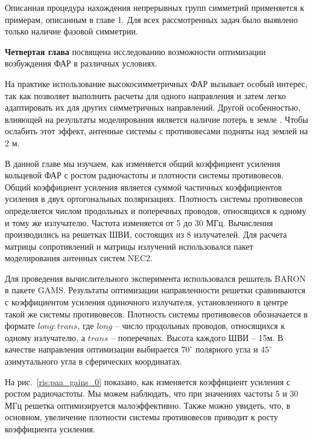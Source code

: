 
Описанная процедура нахождения непрерывных групп симметрий применяется к примерам, описанным в главе 1. Для всех рассмотренных задач было выявлено только наличие фазовой симметрии.

{\textbf{Четвертая глава}} посвящена исследованию возможности оптимизации возбуждения ФАР в различных условиях.

На практике использование высокосимметричных ФАР вызывает особый интерес, так как позволяет выполнить расчеты для одного направления и затем легко адаптировать их для других симметричных направлений. Другой особенностью, влияющей на результаты моделирования является наличие потерь в земле . Чтобы ослабить этот эффект, антенные системы с противовесами подняты над землей на 2 м.

В данной главе мы изучаем, как изменяется общий коэффициент усиления кольцевой ФАР с ростом радиочастоты и плотности системы противовесов. Общий коэффициент усиления является суммой частичных коэффициентов усиления в  двух ортогональных поляризациях. Плотность системы противовесов определяется числом продольных и поперечных проводов, относящихся к одному и тому же излучателю. Частота изменяется от 5 до 30 МГц. Вычисления производились на решетках ШВИ, состоящих из 8 излучателей. Для расчета матрицы сопротивлений и матрицы излучений использовался пакет моделирования антенных систем NEC2.

Для проведения вычислительного эксперимента использовался решатель BARON в пакете GAMS. Результаты оптимизации направленности решетки сравниваются с коэффициентом усиления одиночного излучателя, установленного в центре такой же системы противовесов. Плотность системы противовесов обозначается в формате $long:trans$, где $long$ -- число продольных проводов, относящихся к одному излучателю, а $trans$ -- поперечных. Высота каждого ШВИ -- 15м. В качестве направления оптимизации выбирается $70^{\circ}$ полярного угла и $45^{\circ}$ азимутального угла в сферических координатах.

На рис.~\ref{ris:paa_gains_0} показано, как изменяется коэффициент усиления с ростом радиочастоты. Мы можем наблюдать, что при значениях частоты 5 и 30 МГц решетка оптимизируется малоэффективно. Также можно увидеть, что, в основном, увеличение плотности системы противовесов приводит к росту коэффициента усиления.

